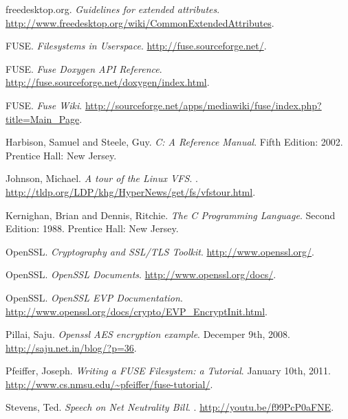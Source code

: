\documentclass[12pt]{article}
\begin{document}
\begin{thebibliography}{13}

 freedesktop.org.
  \newblock \emph{Guidelines for extended attributes}.
  \newblock \url{http://www.freedesktop.org/wiki/CommonExtendedAttributes}.

 FUSE.
  \newblock \emph{Filesystems in Userspace}.
  \newblock \url{http://fuse.sourceforge.net/}.

 FUSE.
  \newblock \emph{Fuse Doxygen API Reference}.
  \newblock \url{http://fuse.sourceforge.net/doxygen/index.html}.

 FUSE.
  \newblock \emph{Fuse Wiki}.
  \newblock \url{http://sourceforge.net/apps/mediawiki/fuse/index.php?title=Main_Page}.

 Harbison, Samuel and Steele, Guy.
  \newblock \emph{C: A Reference Manual}.
  \newblock Fifth Edition: 2002.
  \newblock Prentice Hall: New Jersey.

 Johnson, Michael.
  \newblock \emph{A tour of the Linux VFS}.
  .
  \newblock \url{http://tldp.org/LDP/khg/HyperNews/get/fs/vfstour.html}.

 Kernighan, Brian and Dennis, Ritchie.
  \newblock \emph{The C Programming Language}.
  \newblock Second Edition: 1988.
  \newblock Prentice Hall: New Jersey.

 OpenSSL.
  \newblock \emph{Cryptography and SSL/TLS Toolkit}.
  \newblock \url{http://www.openssl.org/}.

 OpenSSL.
  \newblock \emph{OpenSSL Documents}.
  \newblock \url{http://www.openssl.org/docs/}.

 OpenSSL.
  \newblock \emph{OpenSSL EVP Documentation}.
  \newblock \url{http://www.openssl.org/docs/crypto/EVP_EncryptInit.html}.

 Pillai, Saju.
  \newblock \emph{Openssl AES encryption example}.
  \newblock Decemper 9th, 2008.
  \newblock \url{http://saju.net.in/blog/?p=36}.

 Pfeiffer, Joseph.
  \newblock \emph{Writing a FUSE Filesystem: a Tutorial}.
  \newblock January 10th, 2011.
  \newblock \url{http://www.cs.nmsu.edu/~pfeiffer/fuse-tutorial/}.

 Stevens, Ted.
  \newblock \emph{Speech on Net Neutrality Bill}.
  .
  \newblock \url{http://youtu.be/f99PcP0aFNE}.

\end{thebibliography}
\end{document}
